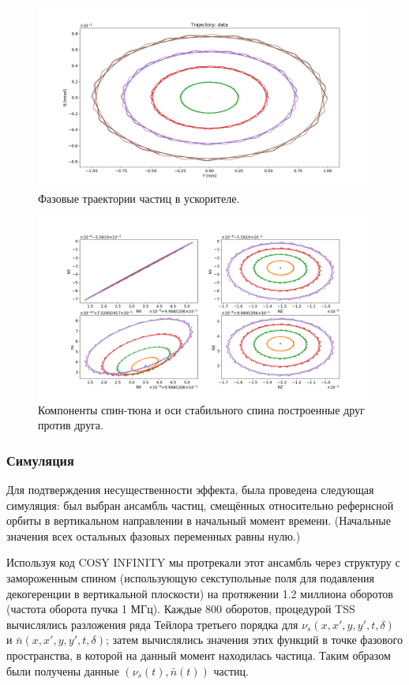 \begin{figure}[h]
	\centering\hfill
	\includegraphics[width=\textwidth]{images/tss_on_betatron/phase_space}
	\caption{Фазовые траектории частиц в ускорителе.\label{fig:phase_space}}
\end{figure}

\begin{figure}[h]
	\centering
	\includegraphics[width=\textwidth]{images/tss_on_betatron/all_vs_all}
	\caption{Компоненты спин-тюна и оси стабильного спина построенные друг против друга.\label{fig:all_vs_all}}
\end{figure}

\subsubsection{Симуляция}
Для подтверждения несущественности эффекта, была проведена следующая симуляция: был выбран ансамбль частиц, смещённых относительно рефернсной орбиты в вертикальном направлении в начальный момент времени. (Начальные значения всех остальных фазовых переменных равны нулю.)

Используя код COSY INFINITY мы протрекали этот ансамбль через структуру с замороженным спином (использующую секступольные поля для подавления декогеренции в вертикальной плоскости) на протяжении 1.2 миллиона оборотов (частота оборота пучка 1 МГц). Каждые 800 оборотов, процедурой TSS~\cite{COSYINF:BeamPhysMan} вычислялись разложения ряда Тейлора третьего порядка для $\nu_s(x,x',y,y',t,\delta)$ и $\bar n(x,x',y,y',t,\delta)$; затем вычислялись значения этих функций в точке фазового пространства, в которой на данный момент находилась частица. Таким образом были получены данные $(\nu_s(t), \bar n(t))$ частиц.

